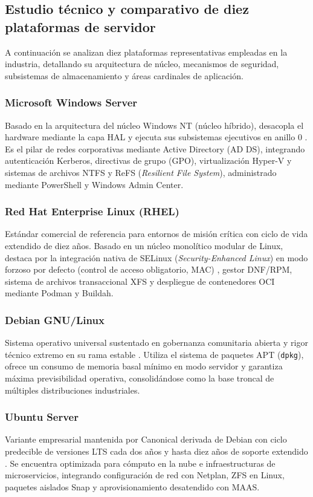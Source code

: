 \documentclass[12pt]{article}
\begin{document}
\subsection{Estudio técnico y comparativo de diez plataformas de servidor}
\label{sec:estudioDiezPlataformas}

A continuación se analizan diez plataformas representativas empleadas en la industria, detallando su arquitectura de núcleo, mecanismos de seguridad, subsistemas de almacenamiento y áreas cardinales de aplicación.

\subsubsection{Microsoft Windows Server}
Basado en la arquitectura del núcleo Windows NT (núcleo híbrido), desacopla el hardware mediante la capa HAL y ejecuta sus subsistemas ejecutivos en anillo 0 \parencite{microsoftWindowsServer}. Es el pilar de redes corporativas mediante Active Directory (AD DS), integrando autenticación Kerberos, directivas de grupo (GPO), virtualización Hyper-V y sistemas de archivos NTFS y ReFS (\textit{Resilient File System}), administrado mediante PowerShell y Windows Admin Center.

\subsubsection{Red Hat Enterprise Linux (RHEL)}
Estándar comercial de referencia para entornos de misión crítica con ciclo de vida extendido de diez años. Basado en un núcleo monolítico modular de Linux, destaca por la integración nativa de SELinux (\textit{Security-Enhanced Linux}) en modo forzoso por defecto (control de acceso obligatorio, MAC) \parencite{redhatRhel}, gestor DNF/RPM, sistema de archivos transaccional XFS y despliegue de contenedores OCI mediante Podman y Buildah.

\subsubsection{Debian GNU/Linux}
Sistema operativo universal sustentado en gobernanza comunitaria abierta y rigor técnico extremo en su rama estable \parencite{debianBookworm}. Utiliza el sistema de paquetes APT (\texttt{dpkg}), ofrece un consumo de memoria basal mínimo en modo servidor y garantiza máxima previsibilidad operativa, consolidándose como la base troncal de múltiples distribuciones industriales.

\subsubsection{Ubuntu Server}
Variante empresarial mantenida por Canonical derivada de Debian con ciclo predecible de versiones LTS cada dos años y hasta diez años de soporte extendido \parencite{canonical2024server}. Se encuentra optimizada para cómputo en la nube e infraestructuras de microservicios, integrando configuración de red con Netplan, ZFS en Linux, paquetes aislados Snap y aprovisionamiento desatendido con MAAS.
\end{document}

